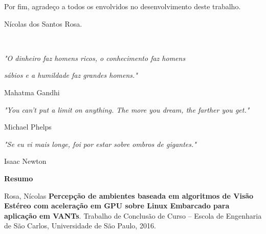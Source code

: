 Por fim, agradeço a todos os envolvidos no desenvolvimento deste trabalho.

\begin{flushright}
Nícolas dos Santos Rosa.
\end{flushright}


\cleardoublepage

\
\vspace{0.76\textheight} 

\begin{flushright}

\textit{"O dinheiro faz homens ricos, o conhecimento faz homens }

\textit{sábios e a humildade faz grandes homens."}

Mahatma Gandhi

\textit{"You can't put a limit on anything. The more you dream, the farther you get."}

Michael Phelps

\textit{"Se eu vi mais longe, foi por estar sobre ombros de gigantes."}

Isaac Newton

\end{flushright}


\cleardoublepage

\vspace{0.11\textheight} 

\begin{center}
\textbf{\Huge{Resumo}}
\end{center}

\vspace{0.05\textheight}

Rosa, Nícolas \textbf{Percepção de ambientes baseada em algoritmos de Visão Estéreo com aceleração em GPU sobre Linux Embarcado para aplicação em VANTs}. Trabalho de Conclusão de Curso -- Escola de Engenharia de São Carlos, Universidade de São Paulo, 2016.

\vspace{0.05\textheight}

